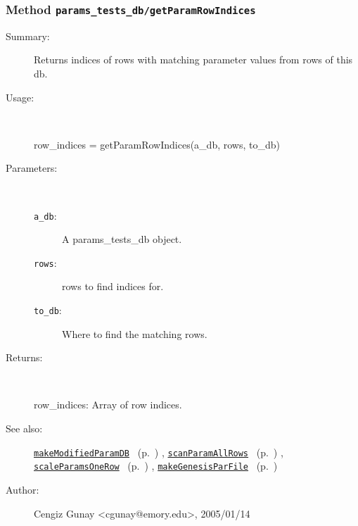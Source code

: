 \subsubsection[Method \texttt{getParamRowIndices}]{Method \texttt{params\_tests\_db/getParamRowIndices}}%
%
\label{ref_params_tests_db__getParamRowIndices}%
\hypertarget{ref_params_tests_db__getParamRowIndices}{}%
\begin{description}
\item[Summary:]Returns indices of rows with matching parameter values from rows of this db.
%
\item[Usage:]~%
\begin{lyxcode}%
row\_indices = getParamRowIndices(a\_db, rows, to\_db)
%
\end{lyxcode}%
%
%
\item[Parameters:]~
\begin{description}%
\item[\texttt{a\_db}:]
 A params\_tests\_db object.
\item[\texttt{rows}:]
 rows to find indices for.
\item[\texttt{to\_db}:]
 Where to find the matching rows.
\end{description}%
%
\item[Returns:]~

	row\_indices: Array of row indices.
%
%
\item[See also:]%
\hyperlink{ref_makeModifiedParamDB}{\texttt{makeModifiedParamDB}}%
\ (p.~\pageref{ref_makeModifiedParamDB})%
%
, \hyperlink{ref_scanParamAllRows}{\texttt{scanParamAllRows}}%
\ (p.~\pageref{ref_scanParamAllRows})%
%
, \hyperlink{ref_scaleParamsOneRow}{\texttt{scaleParamsOneRow}}%
\ (p.~\pageref{ref_scaleParamsOneRow})%
%
, \hyperlink{ref_makeGenesisParFile}{\texttt{makeGenesisParFile}}%
\ (p.~\pageref{ref_makeGenesisParFile})%
%
%
\item[Author:]%
Cengiz Gunay <cgunay@emory.edu>, 2005/01/14%
\end{description}
\methodline%
